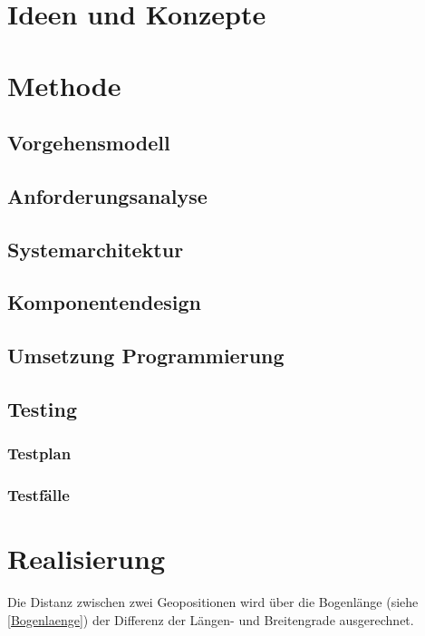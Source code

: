 \documentclass[a4paper]{scrreprt}
\begin{document}
\chapter{Ideen und Konzepte}

\chapter{Methode}

\section{Vorgehensmodell}

\section{Anforderungsanalyse}

\section{Systemarchitektur}

\section{Komponentendesign}

\section{Umsetzung Programmierung}

\section{Testing}

\subsection{Testplan}

\subsection{Testfälle}

\chapter{Realisierung}

Die Distanz zwischen zwei Geopositionen wird über die Bogenlänge (siehe \ref{Bogenlaenge}) der Differenz der Längen- und Breitengrade ausgerechnet.
\end{document}

